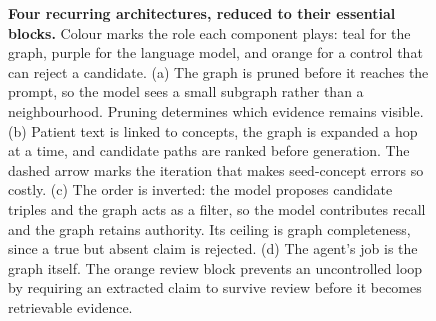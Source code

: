 \begin{figure}[!t]
{%
}
\caption{\textbf{Four recurring architectures, reduced to their essential blocks.} Colour marks the role each component plays: teal for the graph, purple for the language model, and orange for a control that can reject a candidate. (a) The graph is pruned before it reaches the prompt, so the model sees a small subgraph rather than a neighbourhood. Pruning determines which evidence remains visible. (b) Patient text is linked to concepts, the graph is expanded a hop at a time, and candidate paths are ranked before generation. The dashed arrow marks the iteration that makes seed-concept errors so costly. (c) The order is inverted: the model proposes candidate triples and the graph acts as a filter, so the model contributes recall and the graph retains authority. Its ceiling is graph completeness, since a true but absent claim is rejected. (d) The agent's job is the graph itself. The orange review block prevents an uncontrolled loop by requiring an extracted claim to survive review before it becomes retrievable evidence.}
\label{fig:archblocks}
\end{figure}
